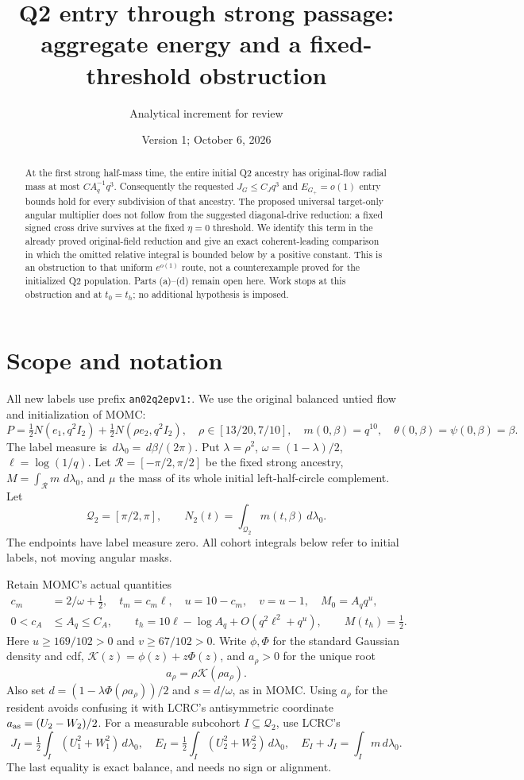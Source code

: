 \documentclass[11pt]{article}
\title{Q2 entry through strong passage:\\aggregate energy and a fixed-threshold obstruction}
\author{Analytical increment for review}
\date{Version 1; October 6, 2026}
\theoremstyle{remark}\newtheorem{remark}[theorem]{Remark}
\newcommand{\dd}{\,d}
\newcommand{\Qtwo}{\mathcal Q_2}
\begin{document}
\maketitle
\begin{abstract}
At the first strong half-mass time, the entire initial Q2 ancestry
has original-flow radial mass at most $C A_q^{-1}q^3$.
Consequently the requested $J_G\le C_Jq^3$ and $E_{G_+}=o(1)$
entry bounds hold for every subdivision of that ancestry.
The proposed universal target-only angular multiplier does not
follow from the suggested diagonal-drive reduction: a fixed signed
cross drive survives at the fixed $\eta=0$ threshold.
We identify this term in the already proved original-field reduction
and give an exact coherent-leading comparison in which the omitted
relative integral is bounded below by a positive constant.
This is an obstruction to that uniform $e^{o(1)}$ route, not a
counterexample proved for the initialized Q2 population.
Parts (a)--(d) remain open here. Work stops at this obstruction and
at $t_0=t_h$; no additional hypothesis is imposed.
\end{abstract}

\section{Scope and notation}
All new labels use prefix \texttt{an02q2epv1:}.
We use the original balanced untied flow and initialization of MOMC:
\[
 P=\tfrac12N(e_1,q^2I_2)+\tfrac12N(\rho e_2,q^2I_2),\quad
 \rho\in[13/20,7/10],\quad
 m(0,\beta)=q^{10},\quad\theta(0,\beta)=\psi(0,\beta)=\beta .
\]
The label measure is $\dd\lambda_0=\dd\beta/(2\pi)$.
Put $\lambda=\rho^2$, $\omega=(1-\lambda)/2$, $\ell=\log(1/q)$.
Let $\mathcal R=[-\pi/2,\pi/2]$ be the fixed strong ancestry,
$M=\int_{\mathcal R}m\,\dd\lambda_0$, and $\mu$ the mass of its
whole initial left-half-circle complement. Let
\[
 \Qtwo=[\pi/2,\pi],\qquad N_2(t)=\int_{\Qtwo}m(t,\beta)\dd\lambda_0 .
\]
The endpoints have label measure zero. All cohort integrals below
refer to initial labels, not moving angular masks.

Retain MOMC's actual quantities
\begin{align}
 c_m&=2/\omega+\tfrac12,\quad t_m=c_m\ell,\quad
 u=10-c_m,\quad v=u-1,\quad M_0=A_q q^u,\nonumber\\
 0<c_A&\le A_q\le C_A,\qquad
 t_h=10\ell-\log A_q+O(q^2\ell^2+q^u),\qquad M(t_h)=\tfrac12 .
 \label{an02q2epv1:clock}
\end{align}
Here $u\ge169/102>0$ and $v\ge67/102>0$.
Write $\phi,\Phi$ for the standard Gaussian density and cdf,
$\mathcal K(z)=\phi(z)+z\Phi(z)$, and $a_\rho>0$ for the unique root
\[
 a_\rho=\rho\mathcal K(\rho a_\rho).
\]
Also set $d=(1-\lambda\Phi(\rho a_\rho))/2$ and $s=d/\omega$,
as in MOMC.
Using $a_\rho$ for the resident avoids confusing it with LCRC's
antisymmetric coordinate $a_{\rm as}=(U_2-W_2)/2$.
For a measurable subcohort $I\subseteq\Qtwo$, use LCRC's
\[
 J_I=\tfrac12\int_I(U_1^2+W_1^2)\dd\lambda_0,\quad
 E_I=\tfrac12\int_I(U_2^2+W_2^2)\dd\lambda_0,\quad
 E_I+J_I=\int_I m\dd\lambda_0 .
\]
The last equality is exact balance, and needs no sign or alignment.
\end{document}

